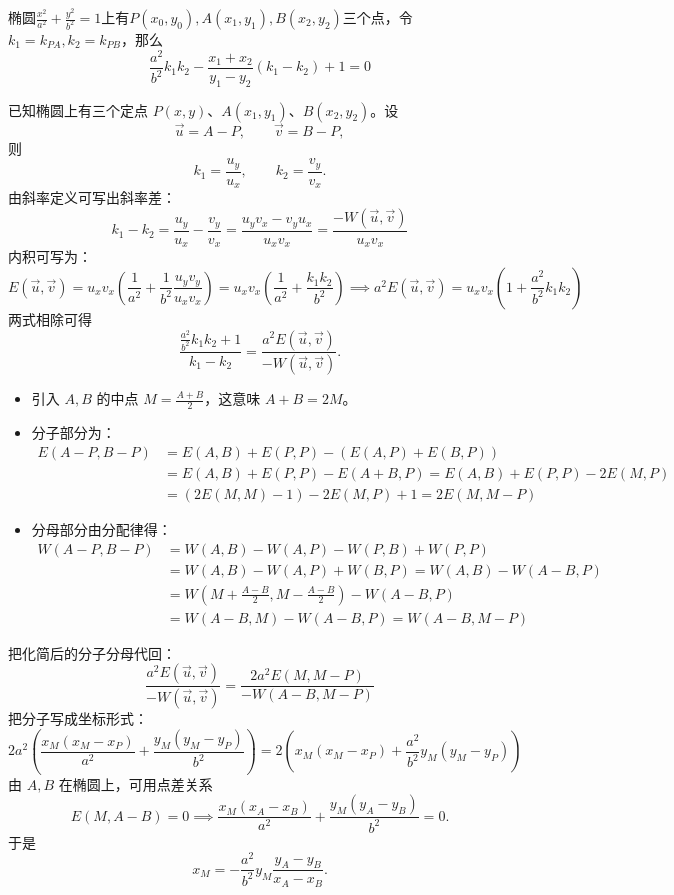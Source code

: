 \begin{conclusion}[一个斜率关系式]
椭圆$\frac{x^2}{a^2}+\frac{y^2}{b^2}=1$上有$P(x_0,y_0),A(x_1,y_1),B(x_2,y_2)$三个点，令$k_1=k_{PA},k_2=k_{PB}$，那么
    $$\frac{a^2}{b^2} k_1 k_2 - \frac{x_1 + x_2}{y_1 - y_2}(k_1 - k_2) + 1 = 0 $$
\end{conclusion}
已知椭圆上有三个定点 $P(x,y)$、$A(x_1,y_1)$、$B(x_2,y_2)$。设
\[
\vec{u} = A - P,\qquad \vec{v} = B - P,
\]
则
\[
k_1 = \frac{u_y}{u_x},\qquad k_2 = \frac{v_y}{v_x}.
\]
由斜率定义可写出斜率差：
$$k_1 - k_2 = \frac{u_y}{u_x} - \frac{v_y}{v_x} = \frac{u_y v_x - v_y u_x}{u_x v_x}=\frac{-W(\vec{u}, \vec{v})}{u_x v_x}$$
内积可写为：
$$E(\vec{u}, \vec{v}) = u_x v_x \left( \frac{1}{a^2} + \frac{1}{b^2} \frac{u_y v_y}{u_x v_x} \right) = u_x v_x \left( \frac{1}{a^2} + \frac{k_1 k_2}{b^2} \right)\implies a^2 E(\vec{u}, \vec{v}) = u_x v_x \left( 1 + \frac{a^2}{b^2} k_1 k_2 \right)$$
两式相除可得
\[
\frac{\frac{a^2}{b^2} k_1 k_2 + 1}{k_1 - k_2} = \frac{a^2 E(\vec{u}, \vec{v})}{-W(\vec{u}, \vec{v})}.
\]
\begin{itemize}
\item 引入 $A, B$ 的中点 $M = \frac{A+B}{2}$，这意味 $A+B = 2M$。
\item 分子部分为：
\begin{align*}
E(A-P, B-P) &= E(A,B)+ E(P,P) - (E(A,P) + E(B,P)) \\
&= E(A,B)+ E(P,P) -E(A+B, P)=E(A,B)+ E(P,P)-2E(M, P)\\
&= (2E(M,M) - 1) - 2E(M,P) + 1 =  {2E(M, M-P)}
\end{align*}
\item 分母部分由分配律得：
\begin{align*}
W(A-P, B-P) &= W(A,B) - W(A,P) - W(P,B) + W(P,P)\\
&= W(A,B) - W(A,P) + W(B,P)=W(A,B)-W(A-B, P)\\
&=W\left(M + \frac{A-B}{2},M - \frac{A-B}{2}\right)- W(A-B, P) \\
&=  W(A-B, M) - W(A-B, P) =W(A-B, M-P)
\end{align*}
\end{itemize}
把化简后的分子分母代回：
$$\frac{a^2 E(\vec{u}, \vec{v})}{-W(\vec{u}, \vec{v})} = \frac{2a^2 E(M, M-P)}{-W(A-B, M-P)}$$
把分子写成坐标形式：
$$2a^2 \left( \frac{x_M (x_M - x_P)}{a^2} + \frac{y_M (y_M - y_P)}{b^2} \right) = 2 \left( x_M (x_M - x_P) + \frac{a^2}{b^2}y_M (y_M - y_P) \right)$$
由 $A,B$ 在椭圆上，可用点差关系
\[
E(M, A-B) = 0 \implies \frac{x_M (x_A - x_B)}{a^2} + \frac{y_M (y_A - y_B)}{b^2} = 0.
\]
于是
\[
x_M = - \frac{a^2}{b^2} y_M \frac{y_A - y_B}{x_A - x_B}.
\]
